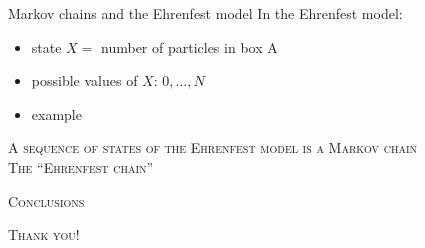 \documentclass[usenames,dvipsnames]{beamer}
\begin{document}
  \begin{frame}{Markov chains and the Ehrenfest model}
    \Large In the Ehrenfest model:
    \normalsize
    \begin{itemize}
      \item<1-> state $X = $ number of particles in box A
      \item<2-> possible values of $X$: $0, \dots, N$
      \item<3-> example
    \end{itemize}
    
    \begin{figure}[r]
    \end{figure}
  \end{frame}

  \begin{frame}[standout]
    \textsc{A sequence of states of the Ehrenfest model is a Markov chain}\\
    \vspace{30pt}
    \textsc{The \enquote{Ehrenfest chain}}
  \end{frame}


  




    


  


\begin{frame}
  \Large 
  \centering
  \textsc{Conclusions}
\end{frame}

\begin{frame}[standout]
  \LARGE
  \textsc{Thank you!}
\end{frame}
\end{document}
